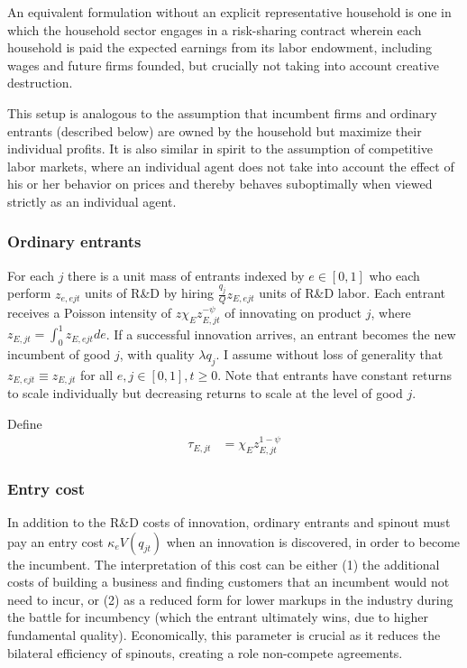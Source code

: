 \documentclass[12pt,english]{article}
\theoremstyle{remark}
\begin{document}
An equivalent formulation without an explicit representative household is one in which the household sector engages in a risk-sharing contract wherein each household is paid the expected earnings from its labor endowment, including wages and future firms founded, but crucially not taking into account creative destruction.  

This setup is analogous to the assumption that incumbent firms and ordinary entrants (described below) are owned by the household but maximize their individual profits. It is also similar in spirit to the assumption of competitive labor markets, where an individual agent does not take into account the effect of his or her behavior on prices and thereby behaves suboptimally when viewed strictly as an individual agent. 


\subsubsection{Ordinary entrants}

For each $j$ there is a unit mass of entrants indexed by $e \in [0,1]$ who each perform $z_{e,ejt}$ units of R\&D by hiring $\frac{q_j}{Q} z_{E,ejt}$ units of R\&D labor. Each entrant receives a Poisson intensity of $z \chi_E z_{E,jt}^{-\psi}$ of innovating on product $j$, where $z_{E,jt} = \int_0^1 z_{E,ejt} de$. If a successful innovation arrives, an entrant becomes the new incumbent of good $j$, with quality $\lambda q_j$. I assume without loss of generality that $z_{E,ejt} \equiv z_{E,jt}$ for all $e,j \in [0,1], t \ge 0$. Note that entrants have constant returns to scale individually but decreasing returns to scale at the level of good $j$.

Define
\begin{align*}
	\tau_{E,jt} &= \chi_E z_{E,jt}^{1-\psi}
\end{align*}


\subsubsection{Entry cost}

In addition to the R\&D costs of innovation, ordinary entrants and spinout must pay an entry cost $\kappa_{e} V(q_{jt})$ when an innovation is discovered, in order to become the incumbent. The interpretation of this cost can be either (1) the additional costs of building a business and finding customers that an incumbent would not need to incur, or (2) as a reduced form for lower markups in the industry during the battle for incumbency (which the entrant ultimately wins, due to higher fundamental quality). Economically, this parameter is crucial as it reduces the bilateral efficiency of spinouts, creating a role non-compete agreements. 
\end{document}
